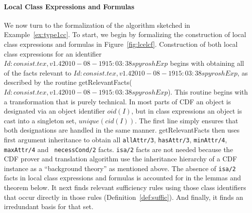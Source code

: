 \paragraph*{Local Class Expressions and Formulas}
We now turn to the formalization of the algorithm sketched in
Example~\ref{ex:type1cc}.  To start, we begin by formalizing the
construction of local class expressions and formulas in
Figure~\ref{fig:lcelcf}.  Construction of both local class expressions
for an identifier $Id: consist.tex,v 1.4 2010-08-19 15:03:38 spyrosh Exp $ begins with obtaining all of the facts relevant
to $Id: consist.tex,v 1.4 2010-08-19 15:03:38 spyrosh Exp $, as described by the routine {\sf getRelevantFacts($Id: consist.tex,v 1.4 2010-08-19 15:03:38 spyrosh Exp $)}.
This routine begins with a transformation that is purely technical.
In most parts of CDF an object is designated via an object identifier
$oid(I)$, but in class expressions an object is cast into a singleton
set, $unique(cid(I))$.  The first line simply ensures that both
designations are handled in the same manner.  {\sf getRelevantFacts}
then uses first argument inheritance to obtain all {\tt allAttr/3},
{\tt hasAttr/3}, {\tt minAttr/4}, {\tt maxAttr/4} and {\tt
necessCond/2} facts.  {\tt isa/2} facts are not needed because the CDF
prover and translation algorithm use the inheritance hierarchy of a
CDF instance as a ``background theory'' as mentioned above.  The
absence of {\tt isa/2} facts in local class expressions and formulas
is accounted for in the lemmas and theorem below. It next finds
relevant sufficiency rules using those class identifiers that occur
directly in those rules (Definition~\ref{def:suffic}).  And finally,
it finds an irredundant basis for that set.

